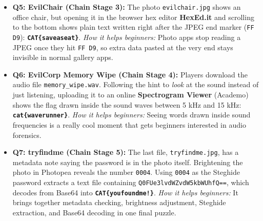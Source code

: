\documentclass[11pt,a4paper]{article}
\begin{document}
\begin{itemize}
    \item \textbf{Q5: EvilChair (Chain Stage 3):} The photo \texttt{evilchair.jpg} shows an office chair, but opening it in the browser hex editor \textbf{HexEd.it} and scrolling to the bottom shows plain text written right after the JPEG end marker (\texttt{FF D9}): \textbf{\texttt{CAT\{saveaseat\}}}. \textit{How it helps beginners:} Photo apps stop reading a JPEG once they hit \texttt{FF D9}, so extra data pasted at the very end stays invisible in normal gallery apps.
    \item \textbf{Q6: EvilCorp Memory Wipe (Chain Stage 4):} Players download the audio file \texttt{memory\_wipe.wav}. Following the hint to \textit{look} at the sound instead of just listening, uploading it to an online \textbf{Spectrogram Viewer} (Academo) shows the flag drawn inside the sound waves between 5 kHz and 15 kHz: \textbf{\texttt{cat\{waverunner\}}}. \textit{How it helps beginners:} Seeing words drawn inside sound frequencies is a really cool moment that gets beginners interested in audio forensics.
    \item \textbf{Q7: tryfindme (Chain Stage 5):} The last file, \texttt{tryfindme.jpg}, has a metadata note saying the password is in the photo itself. Brightening the photo in Photopea reveals the number \texttt{0004}. Using \texttt{0004} as the Steghide password extracts a text file containing \texttt{Q0FUe3lvdWZvdW5kbWUhfQ==}, which decodes from Base64 into \textbf{\texttt{CAT\{youfoundme!\}}}. \textit{How it helps beginners:} It brings together metadata checking, brightness adjustment, Steghide extraction, and Base64 decoding in one final puzzle.
\end{itemize}
\end{document}
